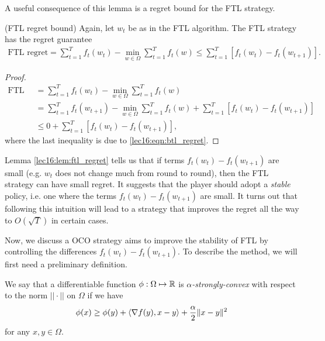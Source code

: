 A useful consequence of this lemma is a regret bound for the FTL strategy.

\begin{lemma}
\label{lec16:lem:ftl_regret}
\textup{(FTL regret bound)} Again, let $w_t$ be as in the FTL algorithm. The FTL strategy has the regret guarantee
\begin{align}
\text{FTL regret} = \sum_{t = 1}^T f_t(w_t) - \min_{w \in \Omega} \sum_{t = 1}^T f_t(w) \leq \sum_{t = 1}^T [f_t(w_t) - f_t(w_{t+1})].
\end{align}
\end{lemma}

\begin{proof}
\begin{align}
\text{FTL regret} &= \sum_{t = 1}^T f_t(w_t) - \min_{w \in \Omega} \sum_{t = 1}^T f_t(w) \\
&= \sum_{t = 1}^T f_t(w_{t+1}) - \min_{w \in \Omega} \sum_{t = 1}^T f_t(w) + \sum_{t = 1}^T [f_t(w_t) - f_t(w_{t+1})] \\
&\leq 0 + \sum_{t = 1}^T [f_t(w_t) - f_t(w_{t+1})],
\end{align}
where the last inequality is due to \eqref{lec16:eqn:btl_regret}.

\end{proof}

Lemma \ref{lec16:lem:ftl_regret} tells us that if terms $f_t(w_t) - f_t(w_{t+1})$ are small (e.g. $w_t$ does not change much from round to round), then the FTL strategy can have small regret. It suggests that the player should adopt a \textit{stable} policy, i.e. one where the terms $f_t(w_t) - f_t(w_{t+1})$ are small.  It turns out that following this intuition will lead to a strategy that improves the regret all the way to $O(\sqrt{T})$ in certain cases.


Now, we discuss a OCO strategy aims to improve the stability of FTL by controlling the differences $f_t(w_t) - f_t(w_{t+1})$. To describe the method, we will first need a preliminary definition.

\begin{definition}
We say that a differentiable function $\phi : \Omega \mapsto \mathbb R$ is \textit{$\alpha$-strongly-convex} with respect to the norm $|| \cdot ||$ on $\Omega$ if we have 
\begin{equation}\label{lec16:eqn:strongly-convex}
\phi(x) \geq \phi(y) + \langle \nabla f(y), x - y \rangle + \frac{\alpha}{2} \|x - y\|^2
\end{equation}
for any $x, y \in \Omega$.
\end{definition}

